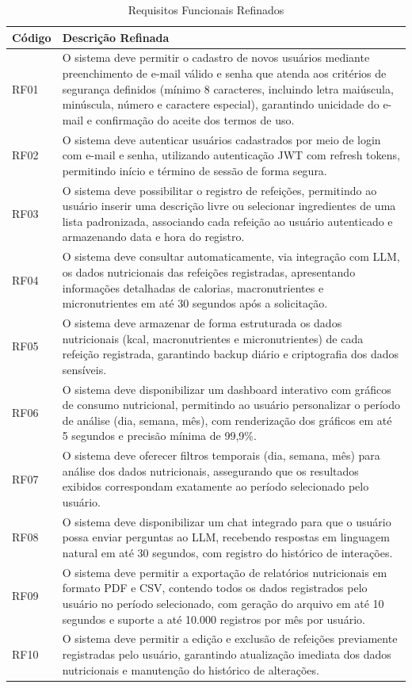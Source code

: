 \begin{longtable}{|l|p{}|}
\caption{Requisitos Funcionais Refinados}
\label{tab:reqs-funcionais-refinados}\\
\hline
\textbf{Código} & \textbf{Descrição Refinada} \\
\hline
\endfirsthead
\endhead
RF01 & O sistema deve permitir o cadastro de novos usuários mediante preenchimento de e-mail válido e senha que atenda aos critérios de segurança definidos (mínimo 8 caracteres, incluindo letra maiúscula, minúscula, número e caractere especial), garantindo unicidade do e-mail e confirmação do aceite dos termos de uso. \\
\hline
RF02 & O sistema deve autenticar usuários cadastrados por meio de login com e-mail e senha, utilizando autenticação JWT com refresh tokens, permitindo início e término de sessão de forma segura. \\
\hline
RF03 & O sistema deve possibilitar o registro de refeições, permitindo ao usuário inserir uma descrição livre ou selecionar ingredientes de uma lista padronizada, associando cada refeição ao usuário autenticado e armazenando data e hora do registro. \\
\hline
RF04 & O sistema deve consultar automaticamente, via integração com LLM, os dados nutricionais das refeições registradas, apresentando informações detalhadas de calorias, macronutrientes e micronutrientes em até 30 segundos após a solicitação. \\
\hline
RF05 & O sistema deve armazenar de forma estruturada os dados nutricionais (kcal, macronutrientes e micronutrientes) de cada refeição registrada, garantindo backup diário e criptografia dos dados sensíveis. \\
\hline
RF06 & O sistema deve disponibilizar um dashboard interativo com gráficos de consumo nutricional, permitindo ao usuário personalizar o período de análise (dia, semana, mês), com renderização dos gráficos em até 5 segundos e precisão mínima de 99,9\%. \\
\hline
RF07 & O sistema deve oferecer filtros temporais (dia, semana, mês) para análise dos dados nutricionais, assegurando que os resultados exibidos correspondam exatamente ao período selecionado pelo usuário. \\
\hline
RF08 & O sistema deve disponibilizar um chat integrado para que o usuário possa enviar perguntas ao LLM, recebendo respostas em linguagem natural em até 30 segundos, com registro do histórico de interações. \\
\hline
RF09 & O sistema deve permitir a exportação de relatórios nutricionais em formato PDF e CSV, contendo todos os dados registrados pelo usuário no período selecionado, com geração do arquivo em até 10 segundos e suporte a até 10.000 registros por mês por usuário. \\
\hline
RF10 & O sistema deve permitir a edição e exclusão de refeições previamente registradas pelo usuário, garantindo atualização imediata dos dados nutricionais e manutenção do histórico de alterações. \\
\hline
\end{longtable}

